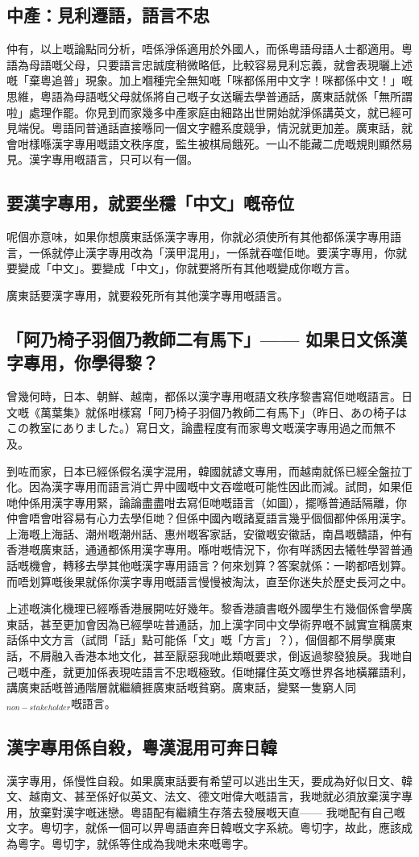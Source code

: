 \subsection*{中產：見利遷語，語言不忠}
仲有，以上嘅論點同分析，唔係淨係適用於外國人，而係粵語母語人士都適用。粵語為母語嘅父母，只要語言忠誠度稍微略低，比較容易見利忘義，就會表現曬上述嘅「棄粵追普」現象。加上嗰種完全無知嘅「咪都係用中文字！咪都係中文！」嘅思維，粵語為母語嘅父母就係將自己嘅子女送曬去學普通話，廣東話就係「無所謂啦」處理作罷。你見到而家幾多中產家庭由細路出世開始就淨係講英文，就已經可見端倪。粵語同普通話直接喺同一個文字體系度競爭，情況就更加差。廣東話，就會咁樣喺漢字專用嘅語文秩序度，監生被棋局餓死。一山不能藏二虎嘅規則顯然易見。漢字專用嘅語言，只可以有一個。

\subsection*{要漢字專用，就要坐穩「中文」嘅帝位}
呢個亦意味，如果你想廣東話係漢字專用，你就必須使所有其他都係漢字專用語言，一係就停止漢字專用改為「漢甲混用」，一係就吞噬佢哋。要漢字專用，你就要變成「中文」。要變成「中文」，你就要將所有其他嘅變成你嘅方言。

廣東話要漢字專用，就要殺死所有其他漢字專用嘅語言。

\subsection*{「阿乃椅子羽個乃教師二有馬下」—— 如果日文係漢字專用，你學得黎？}
曾幾何時，日本、朝鮮、越南，都係以漢字專用嘅語文秩序黎書寫佢哋嘅語言。日文嘅《萬葉集》就係咁樣寫「阿乃椅子羽個乃教師二有馬下」（昨日、あの椅子はこの教室にありました。）寫日文，論盡程度有而家粵文嘅漢字專用過之而無不及。

到咗而家，日本已經係假名漢字混用，韓國就諺文專用，而越南就係已經全盤拉丁化。因為漢字專用而語言消亡畀中國嘅中文吞噬嘅可能性因此而減。試問，如果佢哋仲係用漢字專用緊，論論盡盡咁去寫佢哋嘅語言（如圖），擺喺普通話隔離，你仲會唔會咁容易有心力去學佢哋？但係中國內嘅諸夏語言幾乎個個都仲係用漢字。上海嘅上海話、潮州嘅潮州話、惠州嘅客家話，安徽嘅安徽話，南昌嘅贛語，仲有香港嘅廣東話，通通都係用漢字專用。喺咁嘅情況下，你有咩誘因去犧牲學習普通話嘅機會，轉移去學其他嘅漢字專用語言？何來划算？答案就係：一啲都唔划算。而唔划算嘅後果就係你漢字專用嘅語言慢慢被淘汰，直至你迷失於歷史長河之中。

上述嘅演化機理已經喺香港展開咗好幾年。黎香港讀書嘅外國學生冇幾個係會學廣東話，甚至更加會因為已經學咗普通話，加上漢字同中文學術界嘅不誠實宣稱廣東話係中文方言（試問「話」點可能係「文」嘅「方言」？），個個都不屑學廣東話，不屑融入香港本地文化，甚至厭惡我哋此類嘅要求，倒返過黎發狼戾。我哋自己嘅中產，就更加係表現咗語言不忠嘅極致。佢哋攞住英文喺世界各地橫羅語利，講廣東話嘅普通階層就繼續捱廣東話嘅貧窮。廣東話，變緊一隻窮人同$_{non-stakeholder}$嘅語言。

\subsection*{漢字專用係自殺，粵漢混用可奔日韓}
漢字專用，係慢性自殺。如果廣東話要有希望可以逃出生天，要成為好似日文、韓文、越南文、甚至係好似英文、法文、德文咁偉大嘅語言，我哋就必須放棄漢字專用，放棄對漢字嘅迷戀。粵語配有繼續生存落去發展嘅天直—— 我哋配有自己嘅文字。粵切字，就係一個可以畀粵語直奔日韓嘅文字系統。粵切字，故此，應該成為粵字。粵切字，就係等住成為我哋未來嘅粵字。
